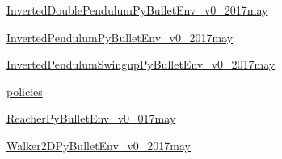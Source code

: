 \begin{DoxyCompactItemize}
\item 
 \hyperlink{namespacepybullet-gym_1_1pybulletgym_1_1tests_1_1roboschool_1_1agents_1_1_inverted_double_pendulum_py_bullet_env__v0__2017may}{Inverted\+Double\+Pendulum\+Py\+Bullet\+Env\+\_\+v0\+\_\+2017may}
\item 
 \hyperlink{namespacepybullet-gym_1_1pybulletgym_1_1tests_1_1roboschool_1_1agents_1_1_inverted_pendulum_py_bullet_env__v0__2017may}{Inverted\+Pendulum\+Py\+Bullet\+Env\+\_\+v0\+\_\+2017may}
\item 
 \hyperlink{namespacepybullet-gym_1_1pybulletgym_1_1tests_1_1roboschool_1_1agents_1_1_inverted_pendulum_swingup_py_bullet_env__v0__2017may}{Inverted\+Pendulum\+Swingup\+Py\+Bullet\+Env\+\_\+v0\+\_\+2017may}
\item 
 \hyperlink{namespacepybullet-gym_1_1pybulletgym_1_1tests_1_1roboschool_1_1agents_1_1policies}{policies}
\item 
 \hyperlink{namespacepybullet-gym_1_1pybulletgym_1_1tests_1_1roboschool_1_1agents_1_1_reacher_py_bullet_env__v0__017may}{Reacher\+Py\+Bullet\+Env\+\_\+v0\+\_\+017may}
\item 
 \hyperlink{namespacepybullet-gym_1_1pybulletgym_1_1tests_1_1roboschool_1_1agents_1_1_walker2_d_py_bullet_env__v0__2017may}{Walker2\+D\+Py\+Bullet\+Env\+\_\+v0\+\_\+2017may}
\end{DoxyCompactItemize}
